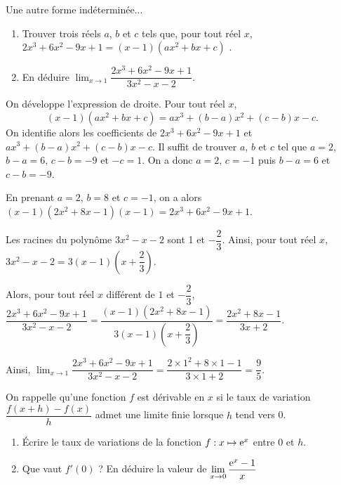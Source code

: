 \documentclass[11pt,fleqn, openany]{book} %
\begin{document}
\begin{exercise}[topic=lim22] Une autre forme indéterminée...
\begin{enumerate}
\item Trouver trois réels $a$, $b$ et $c$ tels que, pour tout réel $x$, \(2x^3+6x^2-9x+1=(x-1)(ax^2+bx+c)\)	.
\item En déduire $\displaystyle \lim_{x \to 1} \dfrac{2x^3+6x^2-9x+1}{3x^2-x-2}$.
\end{enumerate}\end{exercise}

\begin{solution}On développe l'expression de droite. Pour tout réel $x$,
\[(x-1)(ax^2+bx+c) = ax^3+(b-a)x^2+(c-b)x-c.\]
On identifie alors les coefficients de $2x^3+6x^2-9x+1$ et $ax^3+(b-a)x^2+(c-b)x-c$. Il suffit de trouver $a$, $b$ et $c$ tel que $a=2$, $b-a=6$, $c-b=-9$ et $-c=1$. On a donc $a=2$, $c=-1$ puis $b-a=6$ et $c-b=-9$.

En prenant $a=2$, $b=8$ et $c=-1$, on a alors $(x-1)(2x^2+8x-1)(x-1)=2x^3+6x^2-9x+1$.

Les racines du polynôme $3x^2-x-2$ sont 1 et $-\dfrac{2}{3}$. Ainsi, pour tout réel $x$, $3x^2-x-2=3(x-1)\left(x+\dfrac{2}{3}\right)$. 

Alors, pour tout réel $x$ différent de $1$ et $-\dfrac{2}{3}$, $\dfrac{2x^3+6x^2-9x+1}{3x^2-x-2}=\dfrac{(x-1)(2x^2+8x-1)}{3(x-1)\left(x+\dfrac{2}{3}\right)}=\dfrac{2x^2+8x-1}{3x+2}$.

Ainsi, $\displaystyle \lim_{x \to 1} \dfrac{2x^3+6x^2-9x+1}{3x^2-x-2}=\dfrac{2\times 1^2+8\times 1 -1}{3 \times 1 +2 }=\dfrac{9}{5}$.\end{solution}





\begin{exercise}[topic=lim22]

On rappelle qu'une fonction $f$ est dérivable en $x$ si le taux de variation $\dfrac{f(x+h)-f(x)}{h}$ admet une limite finie lorsque $h$ tend vers 0.

\begin{enumerate}
\item Écrire le taux de variations de la fonction $f:x\mapsto \mathrm{e}^x$ entre 0 et $h$.
\item Que vaut $f'(0)$ ? En déduire la valeur de $\displaystyle \lim_{x \to 0} \dfrac{\mathrm{e}^x-1}{x}$
\end{enumerate}\end{exercise}
\end{document}
